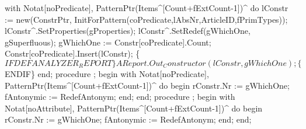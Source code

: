    with Notat[noPredicate], PatternPtr(Items^[Count+fExtCount-1])^ do
      lConstr := new(ConstrPtr,
                     InitForPattern(coPredicate,lAbsNr,ArticleID,fPrimTypes)); 
   lConstr^.SetProperties(gProperties);
   lConstr^.SetRedef(gWhichOne, gSuperfluous);
   gWhichOne :=  Constr[coPredicate].Count;
   Constr[coPredicate].Insert(lConstr);
   \{$IFDEF ANALYZER_REPORT\} 
   AReport.Out_Constructor(lConstr, gWhichOne);
   \{$ENDIF\}
end;
\eatline
{}\nwendcode{}\nwdocspar
\nwenddocs{}\endmoddef\nwstartdeflinemarkup{}\nwenddeflinemarkup
procedure ;
begin
   with Notat[noPredicate], PatternPtr(Items^[Count+fExtCount-1])^ do
   begin
      rConstr.Nr := gWhichOne;
      fAntonymic := RedefAntonym;
   end;
end;
\eatline
{}\nwendcode{}\nwdocspar
\nwenddocs{}\endmoddef\nwstartdeflinemarkup{}\nwenddeflinemarkup
procedure ;
begin
   with Notat[noAttribute], PatternPtr(Items^[Count+fExtCount-1])^ do
   begin
      rConstr.Nr := gWhichOne;
      fAntonymic := RedefAntonym;
   end;
end;
\eatline
{}\nwendcode{}\nwdocspar
\nwenddocs{}\endmoddef\nwstartdeflinemarkup{}\nwenddeflinemarkup
